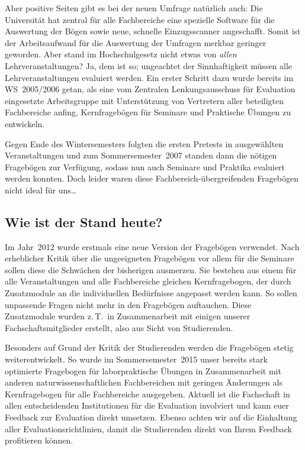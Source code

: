 \begin{multicols}{2}
Aber positive Seiten gibt es bei der neuen Umfrage natürlich auch: Die Universität hat zentral für alle Fachbereiche eine spezielle Software für die Auswertung der Bögen sowie neue, schnelle Einzugsscanner angeschafft.
Somit ist der Arbeitsaufwand für die Auswertung der Umfragen merkbar geringer geworden.
Aber stand im Hochschulgesetz nicht etwas von \emph{allen} Lehrveranstaltungen? Ja, dem ist so; ungeachtet der Sinnhaftigkeit müssen alle Lehrveranstaltungen evaluiert werden.
Ein erster Schritt dazu wurde bereits im WS~2005/2006 getan, als eine vom Zentralen Lenkungsausschuss für Evaluation eingesetzte Arbeitsgruppe mit Unterstützung von Vertretern aller beteiligten Fachbereiche anfing, Kernfragebögen für Seminare und Praktische Übungen zu entwickeln.

Gegen Ende des Wintersemesters folgten die ersten Pretests in ausgewählten Veranstaltungen und zum Sommersemester~2007 standen dann die nötigen Fragebögen zur Verfügung, sodass nun auch Seminare und Praktika evaluiert werden konnten.
Doch leider waren diese Fachbereich-übergreifenden Fragebögen nicht ideal für uns\dots

\subsection{Wie ist der Stand heute?}
Im Jahr~2012 wurde erstmals eine neue Version der Fragebögen verwendet.
Nach erheblicher Kritik über die ungeeigneten Fragebögen vor allem für die Seminare sollen diese die Schwächen der bisherigen ausmerzen.
Sie bestehen aus einem für alle Veranstaltungen und alle Fachbereiche gleichen Kernfragebogen, der durch Zusatzmodule an die individuellen Bedürfnisse angepasst werden kann.
So sollen unpassende Fragen nicht mehr in den Fragebögen auftauchen.
Diese Zusatzmodule wurden z.\,T.\ in Zusammenarbeit mit einigen unserer Fachschaftsmitglieder erstellt, also aus Sicht von Studierenden.

Besonders auf Grund der Kritik der Studierenden werden die Fragebögen stetig weiterentwickelt.
So wurde im Sommersemester~2015 unser bereits stark optimierte Fragebogen für laborpraktische Übungen in Zusammenarbeit mit anderen naturwissenschaftlichen Fachbereichen mit geringen Änderungen als Kernfragebogen für alle Fachbereiche ausgegeben.
Aktuell ist die Fachschaft in allen entscheidenden Institutionen für die Evaluation involviert und kann euer Feedback zur Evaluation direkt umsetzen.
Ebenso achten wir auf die Einhaltung aller Evaluationsrichtlinien, damit die Studierenden direkt von Ihrem Feedback profitieren können.


\end{multicols}
